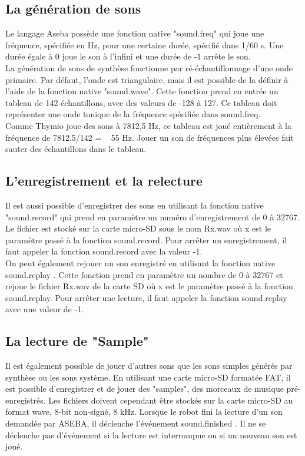 \documentclass[a4paper, 12pt]{report}
\begin{document}
\subsection{La génération de sons}
Le langage Aseba \pageref{aseba} possède une fonction native "sound.freq" qui joue une fréquence, spécifiée en Hz, pour une certaine durée, spécifié dans 1/60 s. Une durée égale à 0 joue le son à l'infini et une durée de -1 arrête le son.\\
La génération de sons de synthèse fonctionne par ré-échantillonnage d'une onde primaire. Par défaut, l'onde est triangulaire, mais il est possible de la	définir à l'aide de la fonction native "sound.wave". Cette fonction prend en entrée un tableau de 142 échantillons, avec des valeurs de -128 à 127. Ce tableau doit représenter une onde tonique de la fréquence spécifiée dans sound.freq.\\
 Comme Thymio joue des sons à 7812,5 Hz, ce tableau est joué entièrement à la fréquence de 7812.5/142 = ~ 55 Hz. Jouer un son de fréquences plus élevées fait sauter des échantillons dans le tableau.

\subsection{L'enregistrement et la relecture}
Il est aussi possible d'enregistrer des sons en utilisant la fonction native "sound.record" qui prend en paramètre un numéro d'enregistrement de 0 à 32767. Le fichier est stocké sur la carte micro-SD sous le nom Rx.wav où x est le paramètre passé à la fonction sound.record. Pour arrêter un enregistrement, il faut appeler la fonction sound.record avec la valeur -1.\\
On peut également rejouer un son enregistré en utilisant la fonction native sound.replay . Cette fonction prend en paramètre un nombre de 0 à 32767 et rejoue le fichier Rx.wav de la carte SD où x est le paramètre passé à la fonction sound.replay. Pour arrêter une lecture, il faut appeler la fonction sound.replay avec une valeur de -1.

\subsection{La lecture de "Sample"}
Il est également possible de jouer d'autres sons que les sons simples générés par synthèse ou les sons système. En utilisant une carte micro-SD formatée FAT, il est possible d'enregistrer et de jouer des "samples", des morceaux de musique pré-enregistrés. Les fichiers doivent cependant être stockés sur la carte micro-SD au format wave, 8-bit non-signé, 8 kHz. Lorsque le robot fini la lecture d'un son demandée par ASEBA, il déclenche l'événement sound.finished . Il ne se déclenche pas d'événement si la lecture est interrompue ou si un nouveau son est joué.\\
\end{document}
